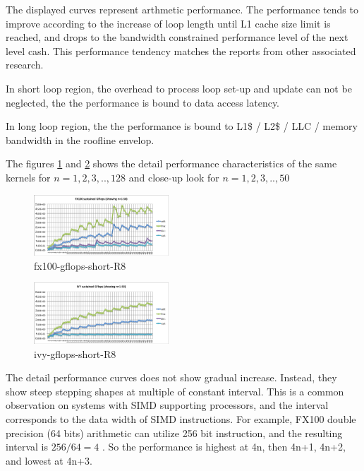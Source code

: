 \documentclass[conference]{IEEEtran}
\begin{document}
The displayed curves represent arthmetic performance.
The performance tends to improve according to the increase of
loop length until L1 cache size limit is reached, and drops to
the bandwidth constrained performance level of the next level cash.
This performance tendency matches the reports from other associated research.

In short loop region,
the overhead to process loop set-up and update can not be neglected,
the the performance is bound to data access latency.

In long loop region,
the the performance is bound to
L1\$ / L2\$ / LLC / memory bandwidth in the roofline envelop.

\cite{Williams:2009:RIV:1498765.1498785} 

The figures
\ref{fig:fx100-gflops-short-R8} and \ref{fig:ivy-gflops-short-R8}
shows the detail performance characteristics of the same kernels
for
\begin{math}
n=1,2,3,..,128
\end{math}
and close-up look for
\begin{math}
n=1,2,3,..,50
\end{math}


\begin{figure}[bt]
\centering
\includegraphics[width=0.45\textwidth]{figs/fx100-gflops-short-R8.pdf}
\caption{fx100-gflops-short-R8}
\label{fig:fx100-gflops-short-R8}
\end{figure}

\begin{figure}[bt]
\centering
\includegraphics[width=0.45\textwidth]{figs/ivy-gflops-short-R8.pdf}
\caption{ivy-gflops-short-R8}
\label{fig:ivy-gflops-short-R8}
\end{figure}

The detail performance curves does not show gradual increase. Instead, they
show steep stepping shapes at multiple of constant interval.
This is a common observation on systems with SIMD supporting processors,
and the interval corresponds to the data width of SIMD instructions.
For example, FX100 double precision (64 bits) arithmetic can utilize
256 bit instruction, and the resulting interval is
\begin{math}
256 / 64 = 4
\end{math}
.
So the performance is highest at 4n, then 4n+1, 4n+2, and lowest at 4n+3.
\end{document}
